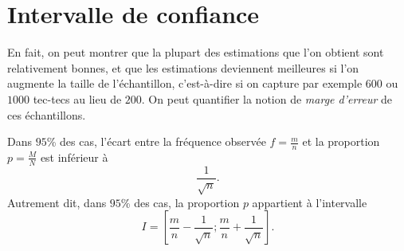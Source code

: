 \documentclass[11pt]{article}
\begin{document}
\section{Intervalle de confiance}

En fait, on peut montrer que la plupart des estimations que l'on obtient sont
relativement bonnes, et que les estimations deviennent meilleures si l'on
augmente la taille de l'échantillon, c'est-à-dire si on capture par exemple
$600$ ou $1000$ tec-tecs au lieu de $200$. On peut quantifier la notion de
\emph{marge d'erreur} de ces échantillons.

\begin{prop}
  Dans $95$\% des cas, l'écart entre la fréquence observée $f=\frac{m}{n}$ et la
  proportion $p=\frac{M}{N}$ est inférieur à
  \[
    \frac{1}{\sqrt n}.
  \]
  Autrement dit, dans $95$\% des cas, la proportion $p$ appartient à l'intervalle 
  \[
    I = \left[ \frac{m}{n}-\frac{1}{\sqrt n}; \frac{m}{n}+\frac{1}{\sqrt n}
    \right].
  \]
\end{prop}
\end{document}
